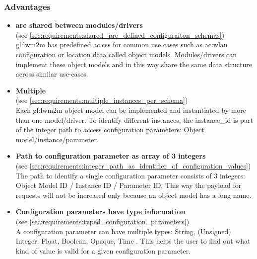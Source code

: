 \subsubsection{Advantages}

\begin{itemize}
      \item \textbf{ are shared between modules/drivers}\\
            (see \autoref{sec:requirements:shared_pre_defined_configuraiton_schemas})\\
            \gls{gl:lwm2m} has predefined \glspl{ac:cs} for common use cases such as \acrshort{ac:wlan} configuration \cite{oma-lwm2m-core-12} or location data \cite[p. 124]{oma-lwm2m-core-12} called object models.
            Modules/drivers can implement these object models and in this way share the same data structure across similar use-cases.

      \item \textbf{Multiple }\\
            (see \autoref{sec:requirements:multiple_instances_per_schema})\\
            Each \gls{gl:lwm2m} object model can be implemented and instantiated by more than one model/driver.
            To identify different instances, the instance\_id is part of the integer path to access configuration parameters: Object model/instance/parameter.

      \item \textbf{Path to configuration parameter as array of 3 integers}\\
            (see \autoref{sec:requirements:integer_path_as_identifier_of_configuration_values})\\
            The path to identify a single configuration parameter consists of 3 integers:
            Object Model ID / Instance ID / Parameter ID. This way the payload for requests will not be increased only because an object model has a long name.

      \item \textbf{Configuration parameters have type information}\\
            (see \autoref{sec:requirements:typed_configuration_parameters})\\
            A configuration parameter can have multiple types:
            String, (Unsigned) Integer, Float, Boolean, Opaque, Time \cite[p. 99]{oma-lwm2m-core-12}.
            This helps the user to find out what kind of value is valid for a given configuration parameter.


\end{itemize}
